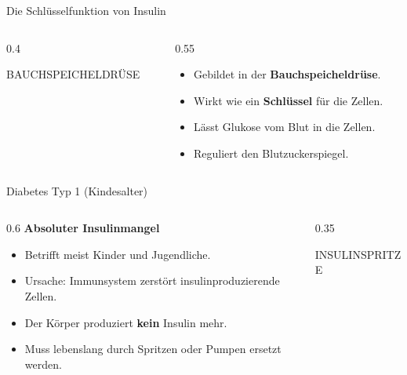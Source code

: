 \documentclass[10pt, aspectratio=169]{beamer}
\newcommand{\imagebox}[2]{%
	\begin{tcolorbox}[enhanced, colback=white, colframe=KitaBlue!20, arc=3mm, width=\textwidth, height=#1, valign=center, halign=center]
		\centering
		\vspace{0.5em}
		\scriptsize \color{KitaBlue!60} \MakeUppercase{#2}
	\end{tcolorbox}
}
\begin{document}
	\begin{frame}{Die Schlüsselfunktion von Insulin}
		\begin{columns}
			\begin{column}{0.4\textwidth}
				\imagebox{5cm}{Bauchspeicheldrüse}
			\end{column}
			\begin{column}{0.55\textwidth}
				\begin{itemize}
					\item Gebildet in der \textbf{Bauchspeicheldrüse}.
					\item Wirkt wie ein \textbf{Schlüssel} für die Zellen.
					\item Lässt Glukose vom Blut in die Zellen.
					\item Reguliert den Blutzuckerspiegel.
				\end{itemize}
			\end{column}
		\end{columns}
	\end{frame}
	
	\begin{frame}{Diabetes Typ 1 (Kindesalter)}
		\begin{columns}
			\begin{column}{0.6\textwidth}
				\textbf{Absoluter Insulinmangel}
				\begin{itemize}
					\item Betrifft meist Kinder und Jugendliche.
					\item Ursache: Immunsystem zerstört insulinproduzierende Zellen.
					\item Der Körper produziert \textbf{kein} Insulin mehr.
					\item Muss lebenslang durch Spritzen oder Pumpen ersetzt werden.
				\end{itemize}
			\end{column}
			\begin{column}{0.35\textwidth}
				\imagebox{4.5cm}{Insulinspritze}
			\end{column}
		\end{columns}
	\end{frame}
	
\end{document}
